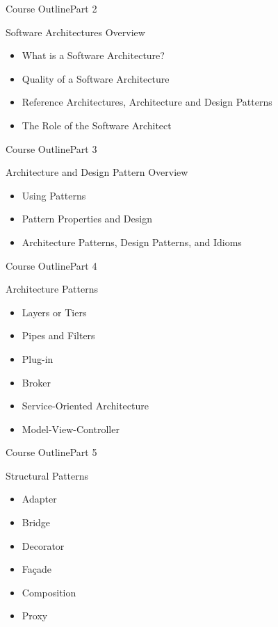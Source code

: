 \begin{frame}{Course Outline}{Part 2}
    \begin{block}{Software Architectures Overview}
       \begin{itemize}
           \item What is a Software Architecture?
           \item Quality of a Software Architecture
           \item Reference Architectures, Architecture and Design Patterns
           \item The Role of the Software Architect
       \end{itemize}
    \end{block}
\end{frame}

\begin{frame}{Course Outline}{Part 3}
    \begin{block}{Architecture and Design Pattern Overview}
       \begin{itemize}
           \item Using Patterns
           \item Pattern Properties and Design
           \item Architecture Patterns, Design Patterns, and Idioms
       \end{itemize}
    \end{block}
\end{frame}

\begin{frame}{Course Outline}{Part 4}
    \begin{block}{Architecture Patterns}
       \begin{itemize}
           \item Layers or Tiers
           \item Pipes and Filters
           \item Plug-in
           \item Broker
           \item Service-Oriented Architecture
           \item Model-View-Controller
       \end{itemize}
    \end{block}
\end{frame}

\begin{frame}{Course Outline}{Part 5}
    \begin{block}{Structural Patterns}
       \begin{itemize}
           \item Adapter
           \item Bridge
           \item Decorator
           \item Façade
           \item Composition
           \item Proxy
       \end{itemize}
    \end{block}
\end{frame}

